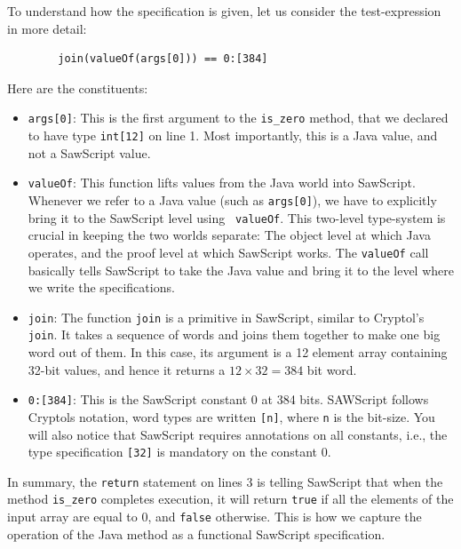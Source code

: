 \documentclass[12pt]{galois-whitepaper}
\newcommand{\sawScript}{{\sc SawScript}\xspace}
\begin{document}
To understand how the specification is given, let us consider the test-expression in more detail:

\begin{verbatim}
        join(valueOf(args[0])) == 0:[384]
\end{verbatim}

Here are the constituents:
\begin{itemize}

\item {\tt args[0]}: This is the first argument to the {\tt is\_zero} method,
        that we declared to have type {\tt int[12]} on line 1. Most
        importantly, this is a Java value, and not a \sawScript value.

\item {\tt valueOf}: This function lifts values from the Java world into
        \sawScript.  Whenever we refer to a Java value (such as {\tt args[0]}),
        we have to explicitly bring it to the \sawScript level using {\tt
        valueOf}. This two-level type-system is crucial in keeping the two
        worlds separate: The object level at which Java operates, and the proof
        level at which \sawScript works. The {\tt valueOf} call basically tells
        \sawScript to take the Java value and bring it to the level where we
        write the specifications.

\item {\tt join}: The function {\tt join} is a primitive in \sawScript, similar
        to Cryptol's {\tt join}. It takes a sequence of words and joins them
        together to make one big word out of them. In this case, its argument
        is a 12 element array containing 32-bit values, and hence it returns a
        $12\times32 = 384$ bit word.  \item {\tt 0:[384]}: This is the
        \sawScript constant 0 at 384 bits.  SAWScript follows Cryptols
        notation, word types are written {\tt [n]}, where {\tt n} is the bit-size.
        You will also notice that
        \sawScript requires annotations on all constants, i.e., the type
        specification {\tt [32]} is mandatory on the constant $0$.

\end{itemize}

In summary, the {\tt return} statement on lines 3 is telling \sawScript that
when the method {\tt is\_zero} completes execution, it will return {\tt true}
if all the elements of the input array are equal to 0, and {\tt false}
otherwise. This is how we capture the operation of the Java method as a
functional \sawScript specification.
\end{document}
